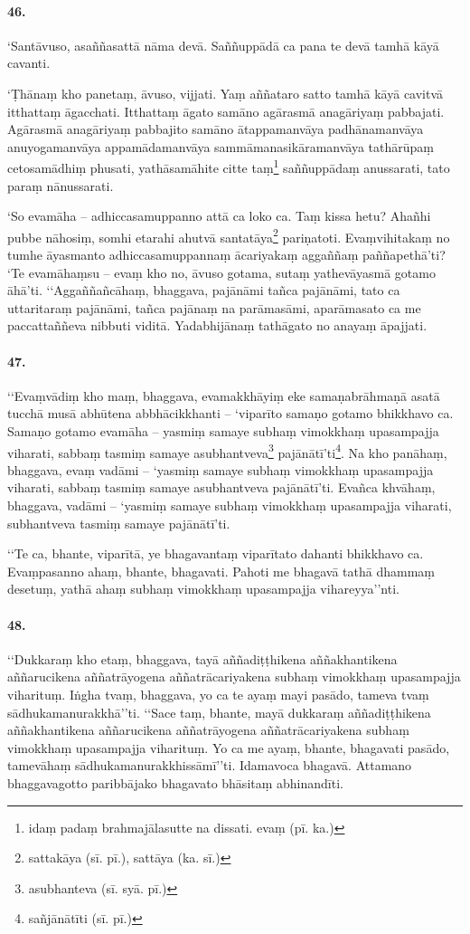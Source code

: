 \paragraph{46.} ‘Santāvuso, asaññasattā nāma devā. Saññuppādā ca pana te devā tamhā kāyā cavanti.

‘Ṭhānaṃ kho panetaṃ, āvuso, vijjati. Yaṃ aññataro satto tamhā kāyā cavitvā itthattaṃ āgacchati. Itthattaṃ āgato samāno agārasmā anagāriyaṃ pabbajati. Agārasmā anagāriyaṃ pabbajito samāno ātappamanvāya padhānamanvāya anuyogamanvāya appamādamanvāya sammāmanasikāramanvāya tathārūpaṃ cetosamādhiṃ phusati, yathāsamāhite citte taṃ\footnote{idaṃ padaṃ brahmajālasutte na dissati. evaṃ (pī. ka.)} saññuppādaṃ anussarati, tato paraṃ nānussarati.

‘So evamāha – adhiccasamuppanno attā ca loko ca. Taṃ kissa hetu? Ahañhi pubbe nāhosiṃ, somhi etarahi ahutvā santatāya\footnote{sattakāya (sī. pī.), sattāya (ka. sī.)} pariṇatoti. Evaṃvihitakaṃ no tumhe āyasmanto adhiccasamuppannaṃ ācariyakaṃ aggaññaṃ paññapethā’ti? ‘Te evamāhaṃsu – evaṃ kho no, āvuso gotama, sutaṃ yathevāyasmā gotamo āhā’ti. ‘‘Aggaññañcāhaṃ, bhaggava, pajānāmi tañca pajānāmi, tato ca uttaritaraṃ pajānāmi, tañca pajānaṃ na parāmasāmi, aparāmasato ca me paccattaññeva nibbuti viditā. Yadabhijānaṃ tathāgato no anayaṃ āpajjati.

\paragraph{47.} ‘‘Evaṃvādiṃ kho maṃ, bhaggava, evamakkhāyiṃ eke samaṇabrāhmaṇā asatā tucchā musā abhūtena abbhācikkhanti – ‘viparīto samaṇo gotamo bhikkhavo ca. Samaṇo gotamo evamāha – yasmiṃ samaye subhaṃ vimokkhaṃ upasampajja viharati, sabbaṃ tasmiṃ samaye asubhantveva\footnote{asubhanteva (sī. syā. pī.)} pajānātī’ti\footnote{sañjānātīti (sī. pī.)}. Na kho panāhaṃ, bhaggava, evaṃ vadāmi – ‘yasmiṃ samaye subhaṃ vimokkhaṃ upasampajja viharati, sabbaṃ tasmiṃ samaye asubhantveva pajānātī’ti. Evañca khvāhaṃ, bhaggava, vadāmi – ‘yasmiṃ samaye subhaṃ vimokkhaṃ upasampajja viharati, subhantveva tasmiṃ samaye pajānātī’ti.

‘‘Te ca, bhante, viparītā, ye bhagavantaṃ viparītato dahanti bhikkhavo ca. Evaṃpasanno ahaṃ, bhante, bhagavati. Pahoti me bhagavā tathā dhammaṃ desetuṃ, yathā ahaṃ subhaṃ vimokkhaṃ upasampajja vihareyya’’nti.

\paragraph{48.} ‘‘Dukkaraṃ kho etaṃ, bhaggava, tayā aññadiṭṭhikena aññakhantikena aññarucikena aññatrāyogena aññatrācariyakena subhaṃ vimokkhaṃ upasampajja viharituṃ. Iṅgha tvaṃ, bhaggava, yo ca te ayaṃ mayi pasādo, tameva tvaṃ sādhukamanurakkhā’’ti. ‘‘Sace taṃ, bhante, mayā dukkaraṃ aññadiṭṭhikena aññakhantikena aññarucikena aññatrāyogena aññatrācariyakena subhaṃ vimokkhaṃ upasampajja viharituṃ. Yo ca me ayaṃ, bhante, bhagavati pasādo, tamevāhaṃ sādhukamanurakkhissāmī’’ti. Idamavoca bhagavā. Attamano bhaggavagotto paribbājako bhagavato bhāsitaṃ abhinandīti.

